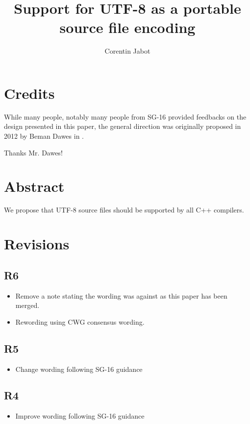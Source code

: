 \documentclass{wg21}
\title{Support for UTF-8 as a portable source file encoding}
\author{Corentin Jabot}{corentin.jabot@gmail.com}
\begin{document}
    
\maketitle


\section{Credits}

While many people, notably many people from SG-16 provided feedbacks on the design presented in this paper,
the general direction was originally proposed in 2012 by Beman Dawes in .

Thanks Mr. Dawes!

\section{Abstract}

We propose that UTF-8 source files should be supported by all C++ compilers.

\section{Revisions}

\subsection{R6}
\begin{itemize}
    \item Remove a note stating the wording was against  as this paper has been merged.
    \item Rewording using CWG consensus wording.
\end{itemize}

\subsection{R5}
\begin{itemize}
    \item Change wording following SG-16 guidance
\end{itemize}

\subsection{R4}
\begin{itemize}
    \item Improve wording following SG-16 guidance
\end{itemize}
\end{document}
